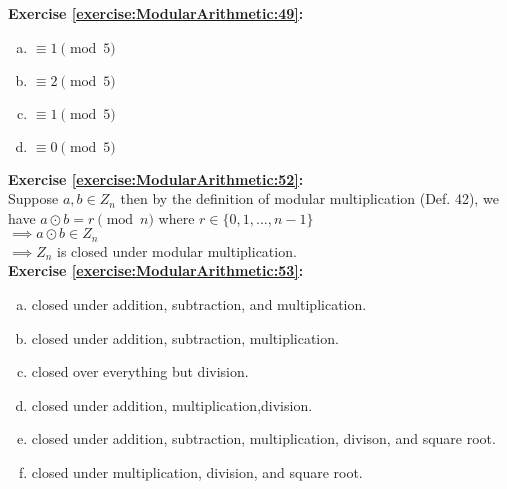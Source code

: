 \noindent\textbf{Exercise \ref{exercise:ModularArithmetic:49}:} 
\begin{enumerate}[(a)]
\item
$\equiv 1 \pmod{5}$

\item
$\equiv 2 \pmod{5}$

\item
$\equiv 1 \pmod{5}$

\item
$\equiv 0 \pmod{5}$
\end{enumerate}

\noindent\textbf{Exercise \ref{exercise:ModularArithmetic:52}:}\\
Suppose $a,b \in Z_n$ then by the definition of modular multiplication (Def. 42), we have $a \odot b =r \pmod{n}$ where $r \in \{0,1,...,n-1\}$\\
$\implies a \odot b \in Z_n$\\
$\implies Z_n$ is closed under modular multiplication.\\

\noindent\textbf{Exercise \ref{exercise:ModularArithmetic:53}:} 
\begin{enumerate}[(a)]
\item
closed under addition, subtraction, and multiplication.
\item
closed under addition, subtraction, multiplication.

\item
closed over everything but division.

\item
closed under addition, multiplication,division.

\item
closed under addition, subtraction, multiplication, divison, and square root.
\item
closed under multiplication, division, and square root.
\end{enumerate}

